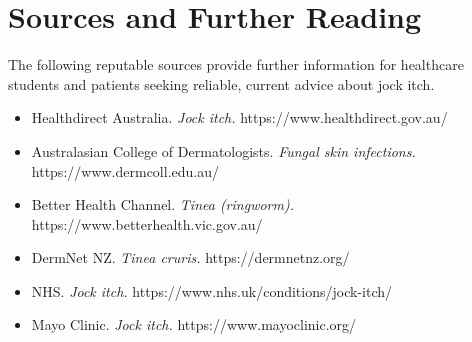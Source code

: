 \section*{Sources and Further Reading}
The following reputable sources provide further information for healthcare students and patients seeking reliable, current advice about jock itch.
\begin{itemize}
    \item Healthdirect Australia. \textit{Jock itch.} https://www.healthdirect.gov.au/
    \item Australasian College of Dermatologists. \textit{Fungal skin infections.} https://www.dermcoll.edu.au/
    \item Better Health Channel. \textit{Tinea (ringworm).} https://www.betterhealth.vic.gov.au/
    \item DermNet NZ. \textit{Tinea cruris.} https://dermnetnz.org/
    \item NHS. \textit{Jock itch.} https://www.nhs.uk/conditions/jock-itch/
    \item Mayo Clinic. \textit{Jock itch.} https://www.mayoclinic.org/
\end{itemize}
